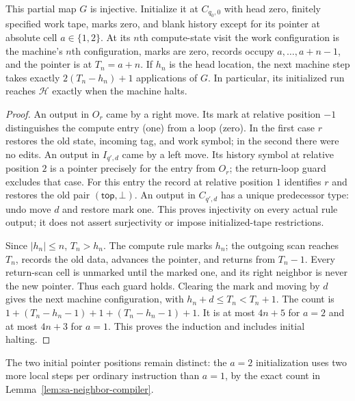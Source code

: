 \begin{lemma}\label{lem:sa-neighbor-compiler}
This partial map $G$ is injective.  Initialize it at $C_{q_0,0}$ with
head zero, finitely specified work tape, marks zero, and blank history
except for its pointer at absolute cell $a\in\{1,2\}$.
At its $n$th compute-state visit the work configuration is the machine's
$n$th configuration, marks are zero, records occupy $a,\ldots,a+n-1$,
and the pointer is at $T_n=a+n$.  If $h_n$ is the head location, the
next machine step takes exactly $2(T_n-h_n)+1$ applications of $G$.
In particular, its initialized run reaches $\mathcal H$ exactly when
the machine halts.
\end{lemma}
\begin{proof}
An output in $O_r$ came by a right move.  Its mark at relative position
$-1$ distinguishes the compute entry (one) from a loop (zero).  In the
first case $r$ restores the old state, incoming tag, and work symbol;
in the second there were no edits.  An output in $I_{q',d}$ came by a
left move.  Its history symbol at relative position $2$ is a pointer
precisely for the entry from $O_r$; the return-loop guard excludes that
case.  For this entry the record at relative position $1$ identifies
$r$ and restores the old pair $(\mathsf{top},\bot)$.  An output in
$C_{q',d}$ has a unique predecessor type: undo move $d$ and restore
mark one.  This proves injectivity on every actual rule output; it does
not assert surjectivity or impose initialized-tape restrictions.

Since $|h_n|\le n$, $T_n>h_n$.  The compute rule marks $h_n$; the
outgoing scan reaches $T_n$, records the old data, advances the pointer,
and returns from $T_n-1$.  Every return-scan cell is unmarked until the
marked one, and its right neighbor is never the new pointer.  Thus each
guard holds.  Clearing the mark and moving by $d$ gives the next machine
configuration, with $h_n+d\le T_n<T_n+1$.  The count is
$1+(T_n-h_n-1)+1+(T_n-h_n-1)+1$.
It is at most $4n+5$ for $a=2$ and at most $4n+3$ for $a=1$.
This proves the induction and includes initial halting.
\end{proof}

The two initial pointer positions remain distinct: the $a=2$
initialization uses two more local steps per ordinary instruction than
$a=1$, by the exact count in Lemma~\ref{lem:sa-neighbor-compiler}.

